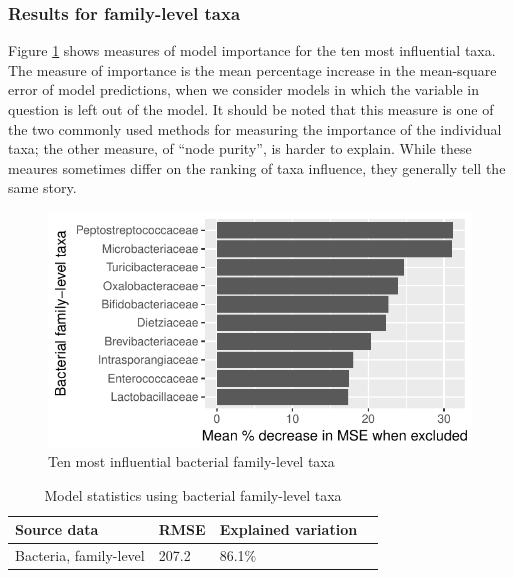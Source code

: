 \documentclass{article}
\begin{document}
\subsubsection{Results for family-level taxa}

Figure \ref{fig:infl_bac_family_taxa} shows measures of model
importance for the ten most influential taxa.  The measure of
importance is the mean percentage increase in the mean-square error of
model predictions, when we consider models in which the variable in
question is left out of the model.  It should be noted that this
measure is one of the two commonly used methods for measuring the
importance of the individual taxa; the other measure, of ``node
purity'', is harder to explain.  While these meaures sometimes differ
on the ranking of taxa influence, they generally tell the same story.
\begin{figure}
  \centering
  \includegraphics{../revise_algorithm/only_families/all_time_steps/hit_1perc_twice/orig_units_all_data_families_PercIncMSE_barchart}
  \caption{Ten most influential bacterial family-level taxa}
  \label{fig:infl_bac_family_taxa}
\end{figure}


\begin{table}
  \centering
\caption{\label{tbl:family_all_data_model_stats}Model statistics using
  bacterial family-level taxa}
\begin{tabular}{llll}
Source data & RMSE & Explained variation\\ \hline
Bacteria, family-level & 207.2 & 86.1\% %
\end{tabular}
\end{table}
\end{document}
